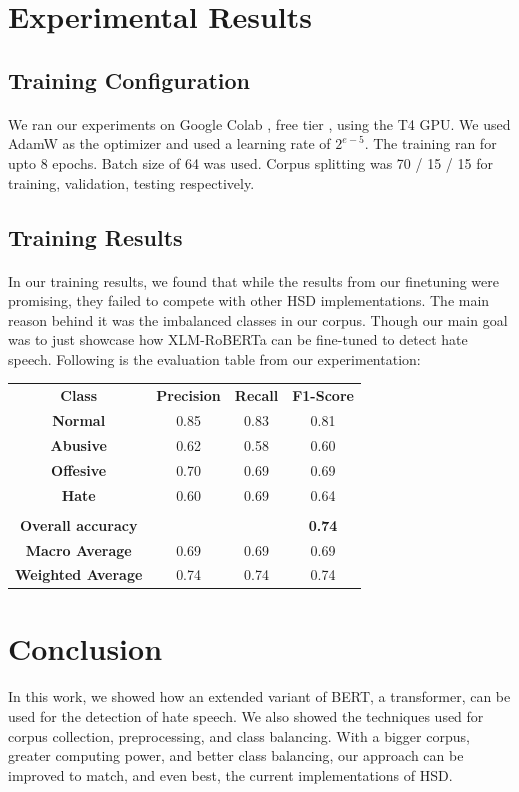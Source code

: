 \documentclass[11pt, a4paper]{article}
\begin{document}
\section{Experimental Results}
\subsection{Training Configuration}
\paragraph{}
We ran our experiments on Google Colab , free tier , using the T4 GPU. We used AdamW as the optimizer and used a learning rate of $2^{e-5}$. The training ran for upto 8 epochs. Batch size of 64 was used. Corpus splitting was 70 / 15 / 15 for training, validation, testing respectively.

\subsection{Training Results}
\paragraph{}
In our training results, we found that while the results from our finetuning were promising, they failed to compete with other HSD implementations. The main reason behind it was the imbalanced classes in our corpus. Though our main goal was to just showcase how XLM-RoBERTa can be fine-tuned to detect hate speech. Following is the evaluation table from our experimentation:
\begin{center}
\begin{tabular}{c|c|c|c}
     \textbf{Class} & \textbf{Precision} & \textbf{Recall} & \textbf{F1-Score}  \\
     \textbf{Normal} & 0.85 & 0.83 & 0.81 \\
     \textbf{Abusive} & 0.62 & 0.58 & 0.60 \\
     \textbf{Offesive} & 0.70 & 0.69 & 0.69 \\
     \textbf{Hate} &  0.60 & 0.69 & 0.64 \\
     & & & \\ 
     \textbf{Overall accuracy} & & & \textbf{0.74} \\
     \textbf{Macro Average} & 0.69 & 0.69 & 0.69 \\
     \textbf{Weighted Average} & 0.74 & 0.74 & 0.74  
\end{tabular}
\end{center}
\section{Conclusion}
\paragraph{}
In this work, we showed how an extended variant of BERT, a transformer, can be used for the detection of hate speech. We also showed the techniques used for corpus collection, preprocessing, and class balancing. With a bigger corpus, greater computing power, and better class balancing, our approach can be improved to match, and even best, the current implementations of HSD.
\printbibliography
\end{document}
